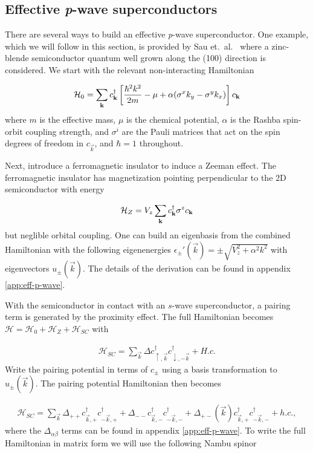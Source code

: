\subsection{Effective \textit{p}-wave superconductors}
There are several ways to build an effective \textit{p}-wave superconductor.
One example, which we will follow in this section, is provided by Sau et.\ al.~\cite{sauGenericNewPlatform2010} where a zinc-blende semiconductor quantum well grown along the (100) direction is considered.
We start with the relevant non-interacting Hamiltonian

\begin{equation}
  \mathcal{H}_0 = \sum_{\mathbf{k}}  c^{\dagger}_{\mathbf{k}} \left[\frac{\hbar^2 k^2}{2m} - \mu + \alpha ( \sigma^x k_y - \sigma^y k_x) \right] c_{\mathbf{k}}
\end{equation}
where $m$ is the effective mass, $\mu$ is the chemical potential, $\alpha$ is the Rashba spin-orbit coupling strength, and $\sigma^i$ are the Pauli matrices that act on the spin degrees of freedom in $c_{\vec{k}}$, and $\hbar=1$ throughout.

Next, introduce a ferromagnetic insulator to induce a Zeeman effect.
The ferromagnetic insulator has magnetization pointing perpendicular to the 2D semiconductor with energy

\begin{equation}
  \mathcal{H}_Z = V_z \sum_{\mathbf{k}} c^{\dagger}_{\mathbf{k}} \sigma^z c_{\mathbf{k}}
\end{equation}
but neglible orbital coupling.
One can build an eigenbasis from the combined Hamiltonian with the following eigenenergies $\epsilon_{\pm}'(\vec{k}) = \pm \sqrt{V_z^2+\alpha^2 k^2}$ with eigenvectors $u_{\pm}(\vec{k})$. The details of the derivation can be found in appendix \ref{app:eff-p-wave}.

With the semiconductor in contact with an $s$-wave superconductor, a pairing term is generated by the proximity effect.
The full Hamiltonian becomes $\mathcal{H} = \mathcal{H}_0 + \mathcal{H}_Z + \mathcal{H}_{SC}$ with

\begin{align}
  \mathcal{H}_{SC} = \sum_{\vec{k}} \Delta c_{\uparrow,\vec{k}}^\dagger c_{\downarrow,-\vec{k}}^\dagger + H.c.
\end{align}
Write the pairing potential in terms of $c_{\pm}$ using a basis transformation to $u_{\pm}(\vec{k})$.
The pairing potential Hamiltonian then becomes

\begin{align}
  \mathcal{H}_{SC} = \sum_{\vec{k}} \Delta_{++}c_{\vec{k},+}^{\dagger}c_{-\vec{k},+}^{\dagger} + \Delta_{- -}c_{\vec{k},-}^{\dagger}c_{-\vec{k},-}^{\dagger} +\Delta_{+-}(\vec{k})c_{\vec{k},+}^{\dagger}c_{-\vec{k},-}^{\dagger} + h.c.,
\end{align}
where the $\Delta_{\alpha \beta}$ terms can be found in appendix \ref{app:eff-p-wave}.
To write the full Hamiltonian in matrix form we will use the following Nambu spinor

